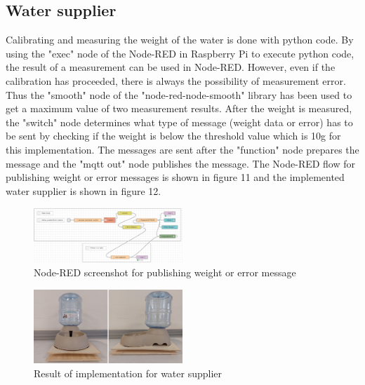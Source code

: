 \documentclass[conference]{IEEEtran}
\begin{document}
\subsection{Water supplier}
Calibrating and measuring the weight of the water is done with python code. By using the "exec" node of the Node-RED in Raspberry Pi to execute python code, the result of a measurement can be used in Node-RED. However, even if the calibration has proceeded, there is always the possibility of measurement error. Thus the "smooth" node of the "node-red-node-smooth" library has been used to get a maximum value of two measurement results.
After the weight is measured, the "switch" node determines what type of message (weight data or error) has to be sent by checking if the weight is below the threshold value which is 10g for this implementation. The messages are sent after the "function" node prepares the message and the "mqtt out" node publishes the message. The Node-RED flow for publishing weight or error messages is shown in figure 11 and the implemented water supplier is shown in figure 12.

\begin{figure}[htbp]
\centerline{\includegraphics[width=0.5\textwidth]{./images/Water Supplier Error Detection.png}}
\caption{Node-RED screenshot for publishing weight or error message}
\label{fig}
\end{figure}

\begin{figure}[htbp]
\centerline{\includegraphics[width=0.5\textwidth]{./images/water-supplier.jpg}}
\caption{Result of implementation for water supplier}
\label{fig}
\end{figure}
\end{document}
